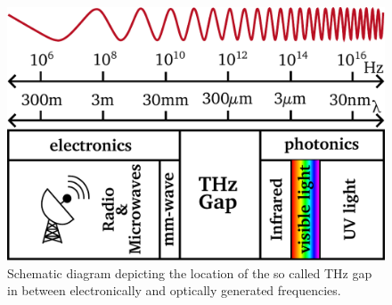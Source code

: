 
\begin{figure}[!btp]
    \includegraphics[height=0.4\textwidth]{figures/THz_overview.pdf}
    \centering
    \caption{Schematic diagram depicting the location of the so called THz gap in between electronically and optically generated frequencies.}
    \label{thz_overview}
\end{figure}








